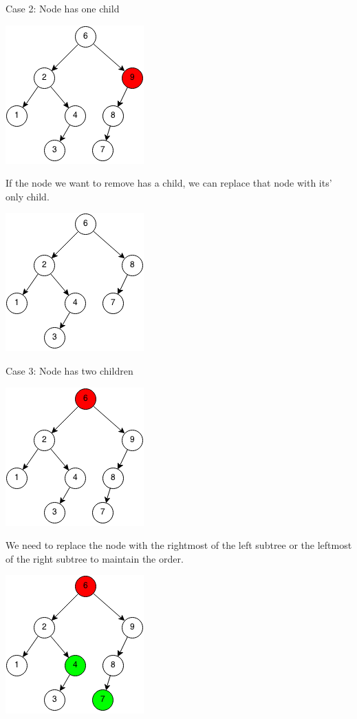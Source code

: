 \documentclass[11pt,oneside]{book}
\makeatletter
\def\maxwidth#1{\ifdim\Gin@nat@width>#1 #1\else\Gin@nat@width\fi}
\makeatother
\begin{document}
Case 2: Node has one child

\vspace{5px}\includegraphics[width=\maxwidth{\textwidth}]{bst-rem-case21.png}

If the node we want to remove has a child, we can replace that node with its' only child.

\vspace{5px}\includegraphics[width=\maxwidth{\textwidth}]{bst-rem-case22.png}

Case 3: Node has two children

\vspace{5px}\includegraphics[width=\maxwidth{\textwidth}]{bst-rem-case31.png}

We need to replace the node with the rightmost of the left subtree or the leftmost of the right subtree to maintain the order.

\vspace{5px}\includegraphics[width=\maxwidth{\textwidth}]{bst-rem-case32.png}
\end{document}
